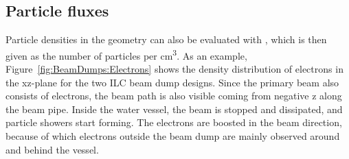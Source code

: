 \subsection{Particle fluxes}
\label{BeamDumps:sim_surrounding:Particle}  
 Particle densities in the geometry can also be evaluated with \fluka, which is then given as the number of particles per \si{\centi\meter\cubed}.
 As an example, Figure~\ref{fig:BeamDumps:Electrons} shows the density distribution of electrons in the xz-plane for the two ILC beam dump designs.
 Since the primary beam also consists of electrons, the beam path is also visible coming from negative z along the beam pipe.
 Inside the water vessel, the beam is stopped and dissipated, and particle showers start forming. The electrons are boosted in the beam direction, because of which electrons outside the beam dump are mainly observed around and behind the vessel.  
